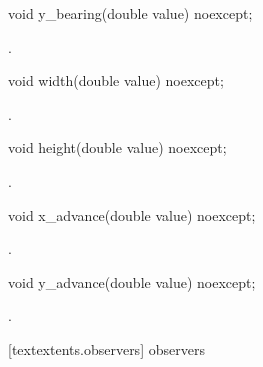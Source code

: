 \begin{itemdecl}
    void y_bearing(double value) noexcept;
\end{itemdecl}
\begin{itemdescr}
	\pnum
	\postconditions
	.
	
\end{itemdescr}

\begin{itemdecl}
    void width(double value) noexcept;
\end{itemdecl}
\begin{itemdescr}
	\pnum
	\postconditions
	.
	
\end{itemdescr}
	
\begin{itemdecl}
    void height(double value) noexcept;
\end{itemdecl}
\begin{itemdescr}
	\pnum
	\postconditions
	.
	
\end{itemdescr}
	
\begin{itemdecl}
    void x_advance(double value) noexcept;
\end{itemdecl}
\begin{itemdescr}
	\pnum
	\postconditions
	.
	
\end{itemdescr}
	
\begin{itemdecl}
    void y_advance(double value) noexcept;
\end{itemdecl}
\begin{itemdescr}
	\pnum
	\postconditions
	.
	
\end{itemdescr}

 [textextents.observers]{ observers}

